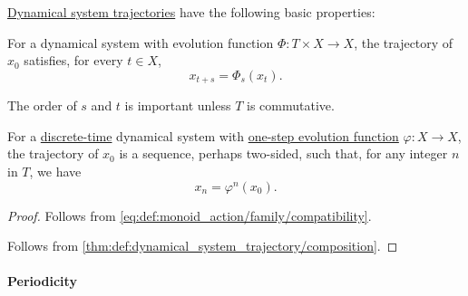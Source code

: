 \begin{proposition}\label{thm:def:dynamical_system_trajectory}
  \hyperref[def:dynamical_system_trajectory]{Dynamical system trajectories} have the following basic properties:
  \begin{thmenum}
     For a dynamical system with evolution function \( \Phi: T \times X \to X \), the trajectory of \( x_0 \) satisfies, for every \( t \in X \),
    \begin{equation*}
      x_{t+s} = \Phi_s(x_t).
    \end{equation*}

    The order of \( s \) and \( t \) is important unless \( T \) is commutative.

     For a \hyperref[def:discrete_dynamical_system]{discrete-time} dynamical system with \hyperref[def:one_step_evolution_function]{one-step evolution function} \( \varphi: X \to X \), the trajectory of \( x_0 \) is a sequence, perhaps two-sided, such that, for any integer \( n \) in \( T \), we have
    \begin{equation*}
      x_n = \varphi^n(x_0).
    \end{equation*}
  \end{thmenum}
\end{proposition}
\begin{proof}
   Follows from \ref{eq:def:monoid_action/family/compatibility}.

   Follows from \cref{thm:def:dynamical_system_trajectory/composition}.
\end{proof}

\paragraph{Periodicity}


